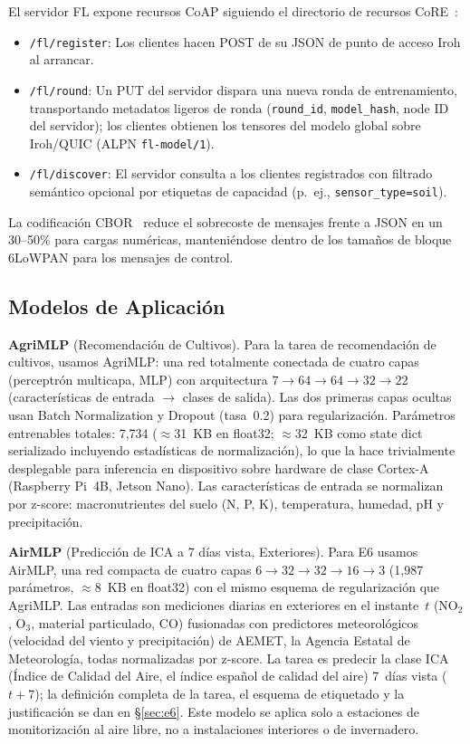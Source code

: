 \documentclass[journal]{IEEEtran}
\begin{document}
El servidor FL expone recursos CoAP siguiendo el directorio de recursos CoRE~\cite{rfc6690}:
\begin{itemize}
    \item \texttt{/fl/register}: Los clientes hacen POST de su JSON de punto de acceso Iroh al arrancar.
    \item \texttt{/fl/round}: Un PUT del servidor dispara una nueva ronda de entrenamiento, transportando metadatos ligeros de ronda (\texttt{round\_id}, \texttt{model\_hash}, node ID del servidor); los clientes obtienen los tensores del modelo global sobre Iroh/QUIC (ALPN \texttt{fl-model/1}).
    \item \texttt{/fl/discover}: El servidor consulta a los clientes registrados con filtrado semántico opcional por etiquetas de capacidad (p.~ej., \texttt{sensor\_type=soil}).
\end{itemize}

La codificación CBOR~\cite{rfc8949} reduce el sobrecoste de mensajes frente a JSON en un 30--50\% para cargas numéricas, manteniéndose dentro de los tamaños de bloque 6LoWPAN para los mensajes de control.

\subsection{Modelos de Aplicación}

\textbf{AgriMLP} (Recomendación de Cultivos). Para la tarea de recomendación de cultivos, usamos AgriMLP: una red totalmente conectada de cuatro capas (perceptrón multicapa, MLP) con arquitectura $7 \to 64 \to 64 \to 32 \to 22$ (características de entrada $\to$ clases de salida). Las dos primeras capas ocultas usan Batch Normalization y Dropout (tasa~0.2) para regularización. Parámetros entrenables totales: 7{,}734 ($\approx$31~KB en float32; $\approx$32~KB como state dict serializado incluyendo estadísticas de normalización), lo que la hace trivialmente desplegable para inferencia en dispositivo sobre hardware de clase Cortex-A (Raspberry Pi~4B, Jetson Nano). Las características de entrada se normalizan por z-score: macronutrientes del suelo (N, P, K), temperatura, humedad, pH y precipitación.

\textbf{AirMLP} (Predicción de ICA a 7 días vista, Exteriores). Para E6 usamos AirMLP, una red compacta de cuatro capas $6 \to 32 \to 32 \to 16 \to 3$ (1{,}987 parámetros, $\approx$8~KB en float32) con el mismo esquema de regularización que AgriMLP. Las entradas son mediciones diarias en exteriores en el instante~$t$ (NO$_2$, O$_3$, material particulado, CO) fusionadas con predictores meteorológicos (velocidad del viento y precipitación) de AEMET, la Agencia Estatal de Meteorología, todas normalizadas por z-score. La tarea es predecir la clase ICA (\'Indice de Calidad del Aire, el índice español de calidad del aire) 7~días vista ($t{+}7$); la definición completa de la tarea, el esquema de etiquetado y la justificación se dan en \S\ref{sec:e6}. Este modelo se aplica solo a estaciones de monitorización al aire libre, no a instalaciones interiores o de invernadero.
\end{document}
